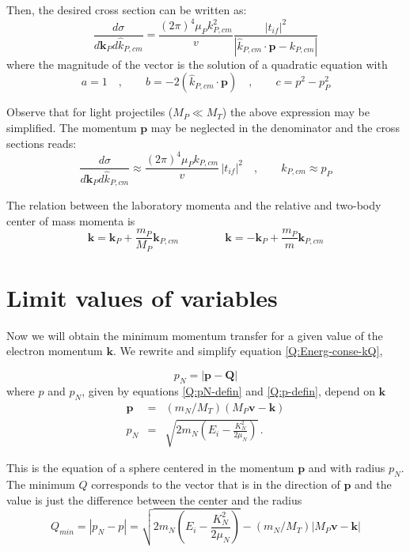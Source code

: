 Then, the desired cross section can be written as:
\begin{equation}\label{Q:xs-pe-cm}
  \frac{d \sigma}{d \bm{k}_{P} d \hat{k}_{P,cm}} = \frac{(2 \pi)^{4}\mu_{P} k^{2}_{P,cm} }{v}\frac{ |t_{if}|^{2}}{|\hat{k}_{P,cm} \cdot \bm{p} - k_{P,cm}|}
\end{equation}
%
where the magnitude of the vector is the solution of a quadratic equation with
$$
a=1 \quad  , \qquad b=-2 \left(\hat{k}_{P,cm} \cdot \bm{p} \right) \quad ,
\qquad c = p^{2} - p_{P}^{2}
$$

Observe that for light projectiles ($M_{P} \ll M_{T}$) the above expression may be simplified. The momentum $\bm{p}$ may be neglected in the denominator and the cross sections reads:
\begin{equation}\label{Q:xs-pe-cm-app}
  \frac{d \sigma}{d \bm{k}_{P} d \hat{k}_{P,cm}} \approx \frac{(2
    \pi)^{4}\mu_{P} k_{P,cm} }{v} \, |t_{if}|^{2} \quad ,  \qquad k_{P,cm}
  \approx p_{P}  
\end{equation}

The relation between the laboratory momenta and the relative and two-body center of mass momenta is
\[
\bm{k}= \bm{k}_{P} + \frac{m_{P}}{M_{P}}\bm{k}_{P,cm} \qquad \, \qquad
\bm{k}= -\bm{k}_{P} + \frac{m_{P}}{m}\bm{k}_{P,cm} 
\]
\section{Limit values of variables}
\label{S:Limit-value-varia}

Now we will obtain the minimum momentum transfer for a given value of
the electron momentum $\bm{k}$. We rewrite and simplify equation
\ref{Q:Energ-conse-kQ},

\begin{equation}\label{Q:Energ-conse-kQ-1}
p_{N} = \left| \bm{p} - \bm{Q} \right|
\end{equation}
%
where $p$ and $p_{N}$, given by equations \ref{Q:pN-defin} and
\ref{Q:p-defin}, depend on $\bm{k}$
\begin{eqnarray*}
\bm{p} &=& \left( m_{N}/M_{T}\right) \left(M_{P} \bm{v} - \bm{k}
\right)
\\
p_{N} &=& \sqrt{2m_{N}\left( E_{i} - \frac{K_{N}^{2}}{2
\mu_{N}} \right)}\, .
\end{eqnarray*}

This is the equation of a sphere centered in the momentum $\bm{p}$ and
with radius $p_{N}$. The minimum $Q$ corresponds to the vector that is
in the direction of $\bm{p}$ and the value is just the difference
between the center and the radius
%
\begin{equation}\label{Q:Qmin-k}
Q_{min} = |p_{N} - p| =  \sqrt{2m_{N}\left( E_{i} - \frac{K_{N}^{2}}{2
\mu_{N}} \right)} - \left( m_{N}/M_{T}\right) \left| M_{P} \bm{v} -
\bm{k} \right|
\end{equation}



